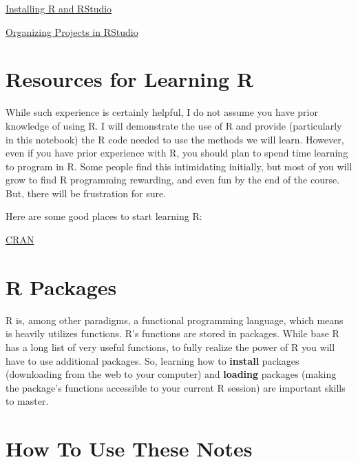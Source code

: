 \documentclass[
]{book}
\begin{document}
\href{https://auburn.hosted.panopto.com/Panopto/Pages/Viewer.aspx?id=5dacd1fe-b888-407b-a89f-ac150135ace8}{Installing R and RStudio}

\href{https://auburn.hosted.panopto.com/Panopto/Pages/Viewer.aspx?id=aed0e2a9-004f-453f-80c7-abbe010a063b}{Organizing Projects in RStudio}

\hypertarget{resources-for-learning-r}{%
\section*{Resources for Learning R}\label{resources-for-learning-r}}

While such experience is certainly helpful, I do not assume you have prior knowledge of using R.
I will demonstrate the use of R and provide (particularly in this notebook) the R code needed to use the methods we will learn.
However, even if you have prior experience with R, you should plan to spend time learning to program in R.
Some people find this intimidating initially, but most of you will grow to find R programming rewarding, and even fun by the end of the course.
But, there will be frustration for sure.

Here are some good places to start learning R:

\href{https://cran.r-project.org/}{CRAN}

\hypertarget{r-packages}{%
\section*{R Packages}\label{r-packages}}

R is, among other paradigms, a functional programming language, which means is heavily utilizes functions.
R's functions are stored in packages.
While base R has a long list of very useful functions, to fully realize the power of R you will have to use additional packages.
So, learning how to \textbf{install} packages (downloading from the web to your computer) and \textbf{loading} packages (making the package's functions accessible to your current R session) are important skills to master.

\hypertarget{how-to-use-these-notes}{%
\section*{How To Use These Notes}\label{how-to-use-these-notes}}
\end{document}
